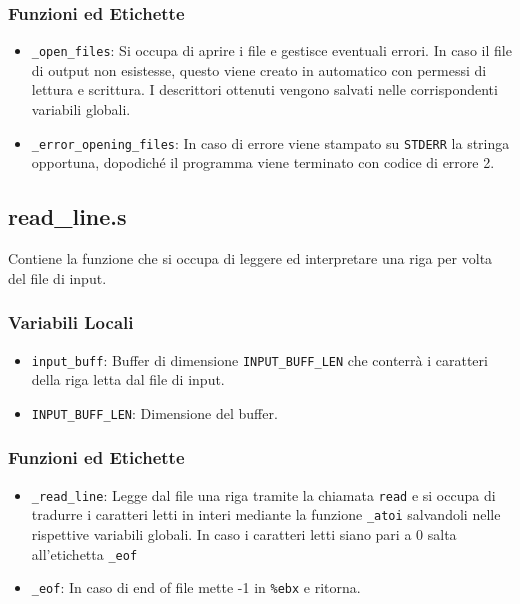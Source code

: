 \documentclass[a4paper,11pt]{article}
\begin{document}
	\subsubsection{Funzioni ed Etichette}
	\begin{itemize}
		\item \texttt{\_open\_files}: Si occupa di aprire i file e gestisce eventuali errori. In caso il file di output non esistesse, questo viene creato in automatico con permessi di lettura e scrittura. I descrittori ottenuti vengono salvati nelle corrispondenti variabili globali. 
		\item \texttt{\_error\_opening\_files}: In caso di errore viene stampato su \texttt{STDERR} la stringa opportuna, dopodiché il programma viene terminato con codice di errore 2. 
	\end{itemize}
	
	\subsection{read\_line.s}
	Contiene la funzione che si occupa di leggere ed interpretare una riga per volta del file di input.
	\subsubsection{Variabili Locali}
	\begin{itemize}
		\item \texttt{input\_buff}: Buffer di dimensione \texttt{INPUT\_BUFF\_LEN} che conterrà i caratteri della riga letta dal file di input.
		\item \texttt{INPUT\_BUFF\_LEN}: Dimensione del buffer.
	\end{itemize}
	
	\subsubsection{Funzioni ed Etichette}
	\begin{itemize}
		\item \texttt{\_read\_line}: Legge dal file una riga tramite la chiamata \texttt{read} e si occupa di tradurre i caratteri letti in interi mediante la funzione \texttt{\_atoi} salvandoli nelle rispettive variabili globali. In caso i caratteri letti siano pari a 0 salta all'etichetta \texttt{\_eof} 
		\item \texttt{\_eof}: In caso di end of file mette -1 in \texttt{\%ebx} e ritorna.
	\end{itemize}
	
\end{document}
